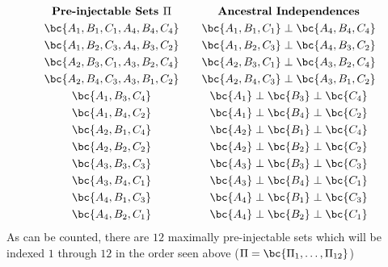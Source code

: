 \documentclass[aps, 10pt, english, twoside, pra, nofootinbib, longbibliography]{revtex4-1}
\theoremstyle{plain}
\theoremstyle{definition}
\theoremstyle{remark}
\newcommand{\ancestralindep}{\perp}
\begin{document}
    \begin{equation}
        \begin{gathered}
            \textbf{Pre-injectable Sets $\Pi$} \\
            \bc{A_1, B_1, C_1, A_4, B_4, C_4} \\
            \bc{A_1, B_2, C_3, A_4, B_3, C_2} \\
            \bc{A_2, B_3, C_1, A_3, B_2, C_4} \\
            \bc{A_2, B_4, C_3, A_3, B_1, C_2} \\
            \bc{A_1, B_3, C_4} \\
            \bc{A_1, B_4, C_2} \\
            \bc{A_2, B_1, C_4} \\
            \bc{A_2, B_2, C_2} \\
            \bc{A_3, B_3, C_3} \\
            \bc{A_3, B_4, C_1} \\
            \bc{A_4, B_1, C_3} \\
            \bc{A_4, B_2, C_1}
        \end{gathered}
        \qquad
        \begin{gathered}
            \textbf{Ancestral Independences} \\
            \bc{A_1, B_1, C_1} \ancestralindep \bc{A_4, B_4, C_4} \\
            \bc{A_1, B_2, C_3} \ancestralindep \bc{A_4, B_3, C_2} \\
            \bc{A_2, B_3, C_1} \ancestralindep \bc{A_3, B_2, C_4} \\
            \bc{A_2, B_4, C_3} \ancestralindep \bc{A_3, B_1, C_2} \\
            \bc{A_1} \ancestralindep \bc{B_3} \ancestralindep \bc{C_4} \\
            \bc{A_1} \ancestralindep \bc{B_4} \ancestralindep \bc{C_2} \\
            \bc{A_2} \ancestralindep \bc{B_1} \ancestralindep \bc{C_4} \\
            \bc{A_2} \ancestralindep \bc{B_2} \ancestralindep \bc{C_2} \\
            \bc{A_3} \ancestralindep \bc{B_3} \ancestralindep \bc{C_3} \\
            \bc{A_3} \ancestralindep \bc{B_4} \ancestralindep \bc{C_1} \\
            \bc{A_4} \ancestralindep \bc{B_1} \ancestralindep \bc{C_3} \\
            \bc{A_4} \ancestralindep \bc{B_2} \ancestralindep \bc{C_1}
        \end{gathered}
    \end{equation}
    As can be counted, there are $12$ maximally pre-injectable sets which will be indexed $1$ through $12$ in the order seen above ($\Pi = \bc{\Pi_1, \ldots, \Pi_{12}}$)
\end{document}
